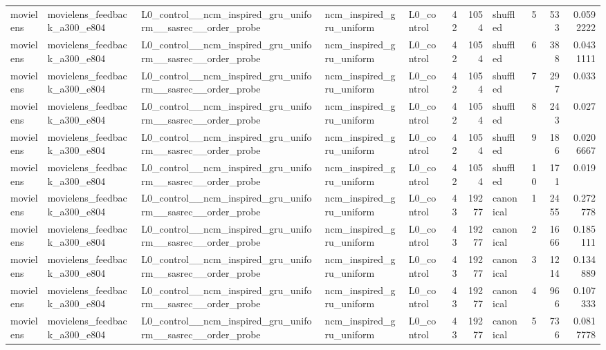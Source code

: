 \begin{table}[htbp!]
\begin{tabular}{lllllrrlrrr}
movielens & movielens\_feedback\_a300\_e804 & L0\_control\_\_ncm\_inspired\_gru\_uniform\_\_sasrec\_\_order\_probe & ncm\_inspired\_gru\_uniform & L0\_control & 42 & 1054 & shuffled & 5 & 533 & 0.0592222 \\
movielens & movielens\_feedback\_a300\_e804 & L0\_control\_\_ncm\_inspired\_gru\_uniform\_\_sasrec\_\_order\_probe & ncm\_inspired\_gru\_uniform & L0\_control & 42 & 1054 & shuffled & 6 & 388 & 0.0431111 \\
movielens & movielens\_feedback\_a300\_e804 & L0\_control\_\_ncm\_inspired\_gru\_uniform\_\_sasrec\_\_order\_probe & ncm\_inspired\_gru\_uniform & L0\_control & 42 & 1054 & shuffled & 7 & 297 & 0.033 \\
movielens & movielens\_feedback\_a300\_e804 & L0\_control\_\_ncm\_inspired\_gru\_uniform\_\_sasrec\_\_order\_probe & ncm\_inspired\_gru\_uniform & L0\_control & 42 & 1054 & shuffled & 8 & 243 & 0.027 \\
movielens & movielens\_feedback\_a300\_e804 & L0\_control\_\_ncm\_inspired\_gru\_uniform\_\_sasrec\_\_order\_probe & ncm\_inspired\_gru\_uniform & L0\_control & 42 & 1054 & shuffled & 9 & 186 & 0.0206667 \\
movielens & movielens\_feedback\_a300\_e804 & L0\_control\_\_ncm\_inspired\_gru\_uniform\_\_sasrec\_\_order\_probe & ncm\_inspired\_gru\_uniform & L0\_control & 42 & 1054 & shuffled & 10 & 171 & 0.019 \\
movielens & movielens\_feedback\_a300\_e804 & L0\_control\_\_ncm\_inspired\_gru\_uniform\_\_sasrec\_\_order\_probe & ncm\_inspired\_gru\_uniform & L0\_control & 43 & 19277 & canonical & 1 & 2455 & 0.272778 \\
movielens & movielens\_feedback\_a300\_e804 & L0\_control\_\_ncm\_inspired\_gru\_uniform\_\_sasrec\_\_order\_probe & ncm\_inspired\_gru\_uniform & L0\_control & 43 & 19277 & canonical & 2 & 1666 & 0.185111 \\
movielens & movielens\_feedback\_a300\_e804 & L0\_control\_\_ncm\_inspired\_gru\_uniform\_\_sasrec\_\_order\_probe & ncm\_inspired\_gru\_uniform & L0\_control & 43 & 19277 & canonical & 3 & 1214 & 0.134889 \\
movielens & movielens\_feedback\_a300\_e804 & L0\_control\_\_ncm\_inspired\_gru\_uniform\_\_sasrec\_\_order\_probe & ncm\_inspired\_gru\_uniform & L0\_control & 43 & 19277 & canonical & 4 & 966 & 0.107333 \\
movielens & movielens\_feedback\_a300\_e804 & L0\_control\_\_ncm\_inspired\_gru\_uniform\_\_sasrec\_\_order\_probe & ncm\_inspired\_gru\_uniform & L0\_control & 43 & 19277 & canonical & 5 & 736 & 0.0817778 \\

\end{tabular}
\end{table}
